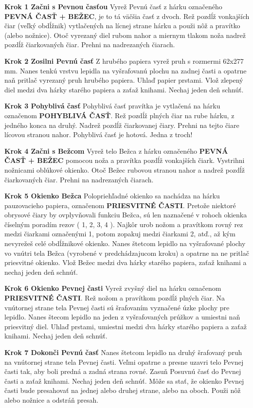 \begin{multicols*}{3}
{  \textbf{Krok 1 Začni s Pevnou časťou} Vyrež Pevnú časť z hárku označeného \textbf{PEVNÁ ČASŤ + BEŽEC}, je to tá väčšia časť z dvoch. Rež pozdĺž vonkajších čiar (veľký obdĺžnik) vytlačených na lícnej strane hárku a použi nôž a pravítko (alebo nožnice). Otoč vyrezaný diel rubom nahor a miernym tlakom noža nadrež pozdĺž čiarkovaných čiar. Prehni na nadrezaných čiarach.

  \textbf{Krok 2 Zosilni Pevnú časť} Z hrubého papiera vyrež pruh s rozmermi 62x277 mm. Nanes tenkú vrstvu lepidla na vyšrafovanú plochu na zadnej časti a opatrne naň pritlač vyrezaný pruh hrubého papiera. Uhlaď papier prstami. Vlož zlepený diel medzi dva hárky starého papiera a zaťaž knihami. Nechaj jeden deň schnúť.

  \textbf{Krok 3 Pohyblivá časť} Pohyblivá časť pravítka je vytlačená na hárku označenom \textbf{POHYBLIVÁ ČASŤ}. Rež pozdĺž plných čiar na rube hárku, z jedného konca na druhý. Nadrež pozdĺž čiarkovanej čiary. Prehni na tejto čiare lícovou stranou nahor. Pohyblivá časť je hotová. Jedna z troch!

  \textbf{Krok 4 Začni s Bežcom} Vyrež telo Bežca z hárku označeného \textbf{PEVNÁ ČASŤ + BEŽEC} pomocou noža a pravítka pozdĺž vonkajších čiark. Vystrihni nožnicami oblúkové okienko. Otoč Bežec rubovou stranou nahor a nadrež pozdĺž čiarkovaných čiar. Prehni na nadrezaných čiarach.

  \textbf{Krok 5 Okienko Bežca} Polopriehľadné okienko sa nachádza na hárku pauzovacieho papiera, označenom \textbf{PRIESVITNÉ ČASTI}. Pretože niektoré obrysové čiary by ovplyvňovali funkciu Bežca, sú len naznačené v rohoch okienka číselným poradím rezov ( 1, 2, 3, 4 ). Najkôr urob nožom a pravítkom rovný rez medzi čiarkami označenými 1, potom zopakuj medzi čiarkami 2, atď., až kým nevyrežeš celé obdĺžnikové okienko. Nanes štetcom lepidlo na vyšrafované plochy vo vnútri tela Bežca (vyrobené v predchádzajucom kroku) a opatrne na ne pritlač priesvitné okienko. Vlož Bežec medzi dva hárky starého papiera, zaťaž knihami a nechaj jeden deň schnúť.

  \textbf{Krok 6 Okienko Pevnej časti} Vyrež zvyšný diel na hárku označenom \textbf{PRIESVITNÉ ČASTI}. Rež nožom a pravítkom pozdĺž plných čiar. Na vnútornej strane tela Pevnej časti sú šrafovaním vyznačené úzke plochy pre lepidlo. Nanes štecom lepidlo na jeden z vyšrafovaných prúžkov a umiestni naň priesvitný diel. Uhlaď prstami, umiestni medzi dva hárky starého papiera a zaťaž knihami. Nechaj jeden deň schnúť.

  \textbf{Krok 7 Dokonči Pevnú časť} Nanes štetcom lepidlo na druhý šrafovaný pruh na vnútornej strane tela Pevnej časti. Veľmi opatrne a presne uzavri telo Pevnej časti tak, aby boli predná a zadná strana rovné. Zasuň Posuvnú časť do Pevnej časti a zaťaž knihami. Nechaj jeden deň schnúť.
Môže sa stať, že okienko Pevnej časti bude presahovať na jednej alebo druhej strane, alebo na oboch. Použi nôž alebo nožnice a odstráň presah.

}
\end{multicols*}
